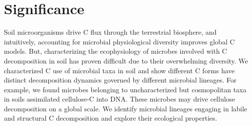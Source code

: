 \section{Significance} Soil microorganisms drive C flux through the terrestrial
biosphere, and intuitively, accounting for microbial physiological diversity
improves global C models. But, characterizing the ecophysiology of microbes
involved with C decomposition in soil has proven difficult due to their
overwhelming diversity. We characterized C use of microbial taxa in soil and
show different C forms have distinct decomposition dynamics governed by
different microbial lineages. For example, we found microbes belonging to
uncharacterized but cosmopolitan taxa in soils assimilated cellulose-C into
DNA. These microbes may drive cellulose decomposition on a global scale. We
identify microbial lineages engaging in labile and structural C decomposition
and explore their ecological properties.
